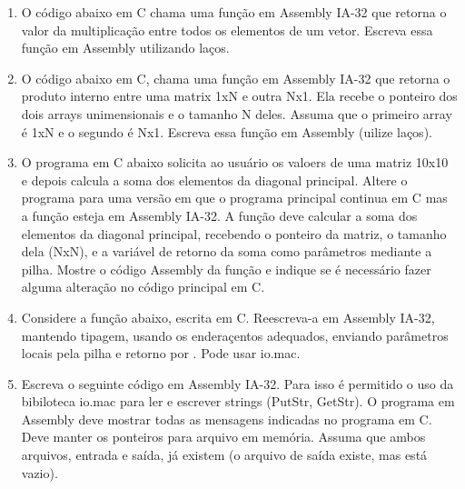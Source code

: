 \begin{enumerate}
    \begin{itemize}
        \item [(a)] 
        \item [(b)] 
        \item [(c)] 
        \item [(d)] 
    \end{itemize}

    \item   
    O código abaixo em C chama uma função em Assembly IA-32 que
    retorna o valor da multiplicação entre todos os elementos de um vetor.
    Escreva essa função em Assembly utilizando laços.

    \item
    O código abaixo em C, chama uma função em Assembly IA-32 que 
    retorna o produto interno entre uma matrix 1xN e outra Nx1.
    Ela recebe o ponteiro dos dois arrays unimensionais e o tamanho N deles.
    Assuma que o primeiro array é 1xN e o segundo é Nx1.
    Escreva essa função em Assembly (uilize laços).

    \item
    O programa em C abaixo solicita ao usuário os valoers de uma matriz 10x10
    e depois calcula a soma dos elementos da diagonal principal.
    Altere o programa para uma versão em que o programa principal continua em C
    mas a função  esteja em Assembly IA-32.
    A função deve calcular a soma dos elementos da diagonal principal,
    recebendo o ponteiro da matriz, o tamanho dela (NxN),
    e a variável de retorno da soma como parâmetros mediante a pilha.
    Mostre o código Assembly da função 
    e indique se é necessário fazer alguma alteração no código principal em C. 

    \item
    Considere a função  abaixo, escrita em C.
    Reescreva-a em Assembly IA-32, mantendo tipagem, 
    usando os enderaçentos adequados,
    enviando parâmetros locais pela pilha
    e retorno por .
    Pode usar io.mac.

    \item
    Escreva o seguinte código em Assembly IA-32.
    Para isso é permitido o uso da bibiloteca io.mac
    para ler e escrever strings (PutStr, GetStr).
    O programa em Assembly deve mostrar 
    todas as mensagens indicadas no programa em C.
    Deve manter os ponteiros para arquivo em memória.
    Assuma que ambos arquivos, entrada e saída, já existem 
    (o arquivo de saída existe, mas está vazio).


\end{enumerate}
